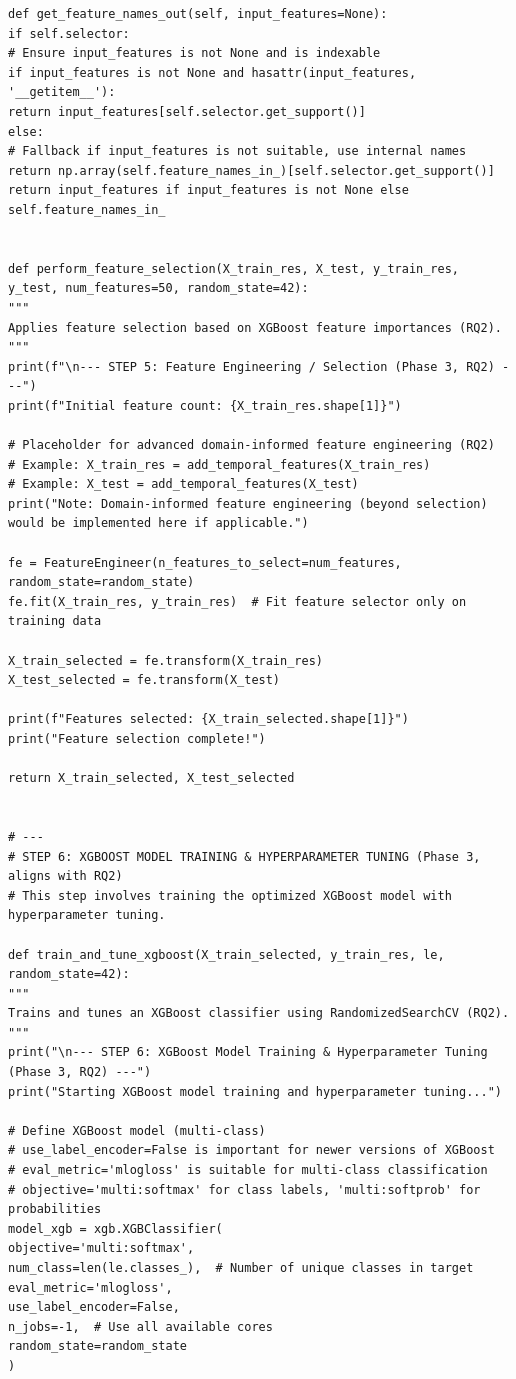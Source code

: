 \begin{lstlisting}[caption={Complete pipeline of XGBoost using CIC-IDS2017 in NIDS using Python}, label={lst:python-pipeline}]
def get_feature_names_out(self, input_features=None):
if self.selector:
# Ensure input_features is not None and is indexable
if input_features is not None and hasattr(input_features, '__getitem__'):
return input_features[self.selector.get_support()]
else:
# Fallback if input_features is not suitable, use internal names
return np.array(self.feature_names_in_)[self.selector.get_support()]
return input_features if input_features is not None else self.feature_names_in_


def perform_feature_selection(X_train_res, X_test, y_train_res, y_test, num_features=50, random_state=42):
"""
Applies feature selection based on XGBoost feature importances (RQ2).
"""
print(f"\n--- STEP 5: Feature Engineering / Selection (Phase 3, RQ2) ---")
print(f"Initial feature count: {X_train_res.shape[1]}")

# Placeholder for advanced domain-informed feature engineering (RQ2)
# Example: X_train_res = add_temporal_features(X_train_res)
# Example: X_test = add_temporal_features(X_test)
print("Note: Domain-informed feature engineering (beyond selection) would be implemented here if applicable.")

fe = FeatureEngineer(n_features_to_select=num_features, random_state=random_state)
fe.fit(X_train_res, y_train_res)  # Fit feature selector only on training data

X_train_selected = fe.transform(X_train_res)
X_test_selected = fe.transform(X_test)

print(f"Features selected: {X_train_selected.shape[1]}")
print("Feature selection complete!")

return X_train_selected, X_test_selected


# ---
# STEP 6: XGBOOST MODEL TRAINING & HYPERPARAMETER TUNING (Phase 3, aligns with RQ2)
# This step involves training the optimized XGBoost model with hyperparameter tuning.

def train_and_tune_xgboost(X_train_selected, y_train_res, le, random_state=42):
"""
Trains and tunes an XGBoost classifier using RandomizedSearchCV (RQ2).
"""
print("\n--- STEP 6: XGBoost Model Training & Hyperparameter Tuning (Phase 3, RQ2) ---")
print("Starting XGBoost model training and hyperparameter tuning...")

# Define XGBoost model (multi-class)
# use_label_encoder=False is important for newer versions of XGBoost
# eval_metric='mlogloss' is suitable for multi-class classification
# objective='multi:softmax' for class labels, 'multi:softprob' for probabilities
model_xgb = xgb.XGBClassifier(
objective='multi:softmax',
num_class=len(le.classes_),  # Number of unique classes in target
eval_metric='mlogloss',
use_label_encoder=False,
n_jobs=-1,  # Use all available cores
random_state=random_state
)


\end{lstlisting}

